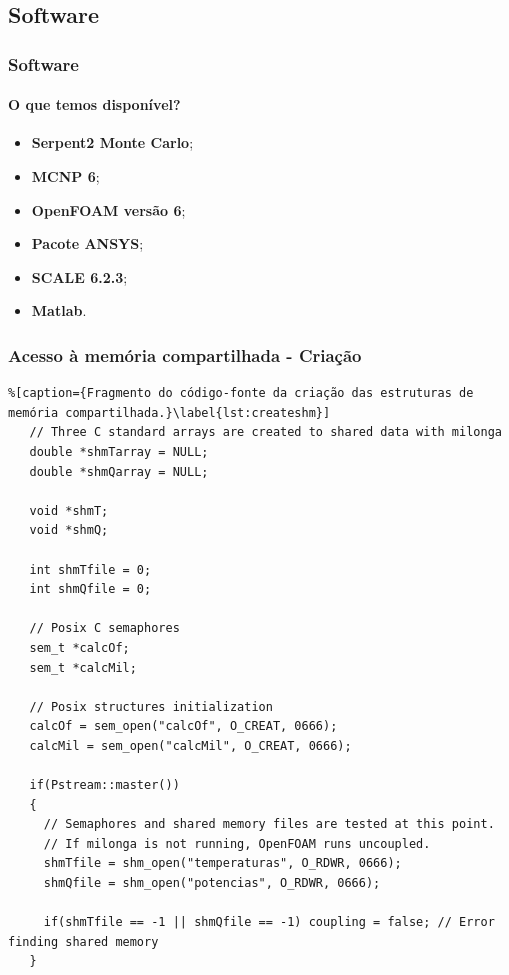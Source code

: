 \documentclass[svgnames,smaller,table]{beamer}
\begin{document}

\subsection{Software}
\begin{frame}
  \frametitle{Software}
  \framesubtitle{O que temos disponível?}
\begin{itemize}
	\item \textbf{Serpent2 Monte Carlo};
	\item \textbf{MCNP 6};
	\item \textbf{OpenFOAM versão 6};
	\item \textbf{Pacote ANSYS};
	\item \textbf{SCALE 6.2.3};
	\item \textbf{Matlab}.
\end{itemize}

\end{frame}



\begin{frame}[fragile]
  \frametitle{Acesso à memória compartilhada - Criação}
 \begin{lstlisting}%[caption={Fragmento do código-fonte da criação das estruturas de memória compartilhada.}\label{lst:createshm}]
   // Three C standard arrays are created to shared data with milonga
   double *shmTarray = NULL;
   double *shmQarray = NULL;
   
   void *shmT;
   void *shmQ;

   int shmTfile = 0;
   int shmQfile = 0;
   
   // Posix C semaphores
   sem_t *calcOf;
   sem_t *calcMil;
   
   // Posix structures initialization
   calcOf = sem_open("calcOf", O_CREAT, 0666);
   calcMil = sem_open("calcMil", O_CREAT, 0666);
   
   if(Pstream::master())
   {
     // Semaphores and shared memory files are tested at this point.
     // If milonga is not running, OpenFOAM runs uncoupled.
     shmTfile = shm_open("temperaturas", O_RDWR, 0666);
     shmQfile = shm_open("potencias", O_RDWR, 0666);
    
     if(shmTfile == -1 || shmQfile == -1) coupling = false; // Error finding shared memory
   }
 \end{lstlisting}
\end{frame}
\end{document}
